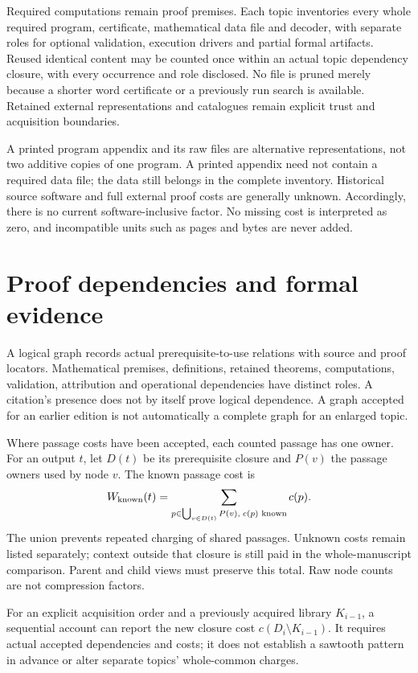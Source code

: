 \documentclass[11pt,a4paper]{article}
\begin{document}
Required computations remain proof premises. Each topic inventories every
whole required program, certificate, mathematical data file and decoder, with
separate roles for optional validation, execution drivers and partial formal
artifacts. Reused identical content may be counted once within an actual topic
dependency closure, with every occurrence and role disclosed. No file is pruned
merely because a shorter word certificate or a previously run search is available.
Retained external representations and catalogues remain explicit trust and
acquisition boundaries.

A printed program appendix and its raw files are alternative representations,
not two additive copies of one program. A printed appendix need not contain a
required data file; the data still belongs in the complete inventory. Historical
source software and full external proof costs are generally unknown. Accordingly,
there is no current software-inclusive factor. No missing cost is interpreted
as zero, and incompatible units such as pages and bytes are never added.

\section{Proof dependencies and formal evidence}

A logical graph records actual prerequisite-to-use relations with source and
proof locators. Mathematical premises, definitions, retained theorems,
computations, validation, attribution and operational dependencies have distinct
roles. A citation's presence does not by itself prove logical dependence.
A graph accepted for an earlier edition is not automatically a complete graph
for an enlarged topic.

Where passage costs have been accepted, each counted passage has one owner.
For an output $t$, let $D(t)$ be its prerequisite closure and $P(v)$ the passage
owners used by node $v$. The known passage cost is
\[
 W_{\rm known}(t)=
 \sum_{p\in\bigcup_{v\in D(t)}P(v),\;c(p)\text{ known}}c(p).
\]
The union prevents repeated charging of shared passages. Unknown costs remain
listed separately; context outside that closure is still paid in the
whole-manuscript comparison. Parent and child views must preserve this total.
Raw node counts are not compression factors.

For an explicit acquisition order and a previously acquired library $K_{i-1}$,
a sequential account can report the new closure cost
$c(D_i\setminus K_{i-1})$. It requires actual accepted dependencies and costs;
it does not establish a sawtooth pattern in advance or alter separate topics'
whole-common charges.
\end{document}
